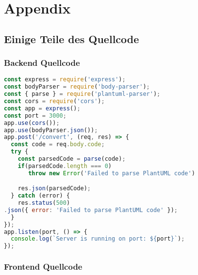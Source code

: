 
\chapter{Appendix}
\section{Einige Teile des Quellcode}
\subsection{Backend Quellcode}

\begin{lstlisting}[caption={Node/Express Backend Quelltext}, label={lst:bakcend}, language=javascript]
const express = require('express');
const bodyParser = require('body-parser');
const { parse } = require('plantuml-parser');
const cors = require('cors');
const app = express();
const port = 3000;
app.use(cors());
app.use(bodyParser.json());
app.post('/convert', (req, res) => {
  const code = req.body.code;
  try {
    const parsedCode = parse(code);
    if(parsedCode.length === 0)
       throw new Error('Failed to parse PlantUML code')

    res.json(parsedCode);
  } catch (error) {
    res.status(500)
.json({ error: 'Failed to parse PlantUML code' });
  }
});
app.listen(port, () => {
  console.log(`Server is running on port: ${port}`);
});
\end{lstlisting}


\subsection{Frontend Quellcode}
